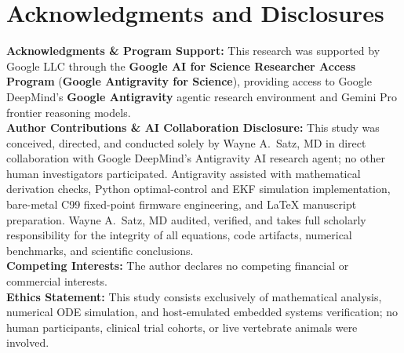 \documentclass[11pt]{article}
\theoremstyle{plain}
\theoremstyle{remark}
\begin{document}
\section*{Acknowledgments and Disclosures}
\footnotesize
\noindent\textbf{Acknowledgments \& Program Support:} This research was supported by Google LLC through the \textbf{Google AI for Science Researcher Access Program} (\textbf{Google Antigravity for Science}), providing access to Google DeepMind's \textbf{Google Antigravity} agentic research environment and Gemini Pro frontier reasoning models.\\
\noindent\textbf{Author Contributions \& AI Collaboration Disclosure:} This study was conceived, directed, and conducted solely by Wayne A.~Satz, MD in direct collaboration with Google DeepMind's Antigravity AI research agent; no other human investigators participated. Antigravity assisted with mathematical derivation checks, Python optimal-control and EKF simulation implementation, bare-metal C99 fixed-point firmware engineering, and \LaTeX{} manuscript preparation. Wayne A.~Satz, MD audited, verified, and takes full scholarly responsibility for the integrity of all equations, code artifacts, numerical benchmarks, and scientific conclusions.\\
\noindent\textbf{Competing Interests:} The author declares no competing financial or commercial interests.\\
\noindent\textbf{Ethics Statement:} This study consists exclusively of mathematical analysis, numerical ODE simulation, and host-emulated embedded systems verification; no human participants, clinical trial cohorts, or live vertebrate animals were involved.

\let\oldthebibliography\thebibliography
\renewcommand{\thebibliography}[1]{\oldthebibliography{#1}\setlength{\itemsep}{2pt}\setlength{\parskip}{0pt}}


\end{document}
